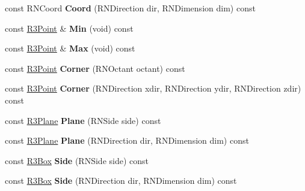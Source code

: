 \begin{DoxyCompactItemize}
\item 
const R\+N\+Coord {\bfseries Coord} (R\+N\+Direction dir, R\+N\+Dimension dim) const \hypertarget{class_r3_box_a1770ca5eeb37cd3cdef00a44fa8217f7}{}\label{class_r3_box_a1770ca5eeb37cd3cdef00a44fa8217f7}

\item 
const \hyperlink{class_r3_point}{R3\+Point} \& {\bfseries Min} (void) const \hypertarget{class_r3_box_a0141f7a79d1d174436e02a78663de034}{}\label{class_r3_box_a0141f7a79d1d174436e02a78663de034}

\item 
const \hyperlink{class_r3_point}{R3\+Point} \& {\bfseries Max} (void) const \hypertarget{class_r3_box_a3cc49c8bd2bb7ab30efa7bf6d772f26f}{}\label{class_r3_box_a3cc49c8bd2bb7ab30efa7bf6d772f26f}

\item 
const \hyperlink{class_r3_point}{R3\+Point} {\bfseries Corner} (R\+N\+Octant octant) const \hypertarget{class_r3_box_aa6b5fbef1fcef288689d778abf7352f0}{}\label{class_r3_box_aa6b5fbef1fcef288689d778abf7352f0}

\item 
const \hyperlink{class_r3_point}{R3\+Point} {\bfseries Corner} (R\+N\+Direction xdir, R\+N\+Direction ydir, R\+N\+Direction zdir) const \hypertarget{class_r3_box_adf929e2e9a2140369311a1e4c8fec61b}{}\label{class_r3_box_adf929e2e9a2140369311a1e4c8fec61b}

\item 
const \hyperlink{class_r3_plane}{R3\+Plane} {\bfseries Plane} (R\+N\+Side side) const \hypertarget{class_r3_box_a73ad684a88a4866a29dec4c6ba75a7e1}{}\label{class_r3_box_a73ad684a88a4866a29dec4c6ba75a7e1}

\item 
const \hyperlink{class_r3_plane}{R3\+Plane} {\bfseries Plane} (R\+N\+Direction dir, R\+N\+Dimension dim) const \hypertarget{class_r3_box_a51aa155a1c4d8d64a5b5f77e287d5097}{}\label{class_r3_box_a51aa155a1c4d8d64a5b5f77e287d5097}

\item 
const \hyperlink{class_r3_box}{R3\+Box} {\bfseries Side} (R\+N\+Side side) const \hypertarget{class_r3_box_a439929c5e65d8b4d39b0f2cdc0b699f3}{}\label{class_r3_box_a439929c5e65d8b4d39b0f2cdc0b699f3}

\item 
const \hyperlink{class_r3_box}{R3\+Box} {\bfseries Side} (R\+N\+Direction dir, R\+N\+Dimension dim) const \hypertarget{class_r3_box_a387587128d4af3793753e03fb097e4b8}{}\label{class_r3_box_a387587128d4af3793753e03fb097e4b8}


\end{DoxyCompactItemize}
